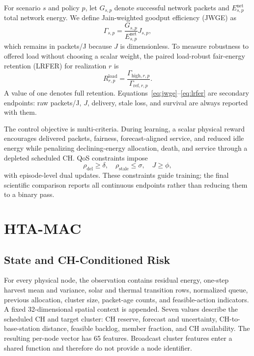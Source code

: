 \documentclass[journal]{IEEEtran}
\begin{document}
For scenario $s$ and policy $p$, let $G_{s,p}$ denote successful network
packets and $E_{s,p}^{\mathrm{net}}$ total network energy. We define
Jain-weighted goodput efficiency (JWGE) as
\begin{equation}
 \Gamma_{s,p}=\frac{G_{s,p}}{E_{s,p}^{\mathrm{net}}}J_{s,p},
 \label{eq:jwge}
\end{equation}
which remains in packets/J because $J$ is dimensionless. To measure robustness
to offered load without choosing a scalar weight, the paired load-robust
fair-energy retention (LRFER) for realization $r$ is
\begin{equation}
 R_{r,p}^{\mathrm{load}}=
 \frac{\Gamma_{\mathrm{high},r,p}}
      {\Gamma_{\mathrm{ref},r,p}}.
 \label{eq:lrfer}
\end{equation}
A value of one denotes full retention. Equations~\eqref{eq:jwge}--\eqref{eq:lrfer}
are secondary endpoints: raw packets/J, $J$, delivery, stale loss, and survival
are always reported with them.

The control objective is multi-criteria. During learning, a scalar physical
reward encourages delivered packets, fairness, forecast-aligned service, and
reduced idle energy while penalizing declining-energy allocation, death, and
service through a depleted scheduled CH. QoS constraints impose
\begin{equation}
 \rho_{\mathrm{del}}\ge\delta,\quad
 \rho_{\mathrm{stale}}\le\sigma,\quad J\ge\phi,
 \label{eq:constraints}
\end{equation}
with episode-level dual updates. These constraints guide training; the final
scientific comparison reports all continuous endpoints rather than reducing
them to a binary pass.

\section{HTA-MAC}

\subsection{State and CH-Conditioned Risk}

For every physical node, the observation contains residual energy, one-step
harvest mean and variance, solar and thermal transition rows, normalized queue,
previous allocation, cluster size, packet-age counts, and feasible-action
indicators. A fixed 32-dimensional spatial context is appended. Seven values
describe the scheduled CH and target cluster: CH reserve, forecast and
uncertainty, CH-to-base-station distance, feasible backlog, member fraction,
and CH availability. The resulting per-node vector has 65 features. Broadcast
cluster features enter a shared function and therefore do not provide a node
identifier.
\end{document}
